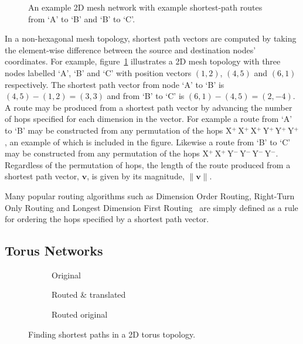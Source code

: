 		\begin{figure}
			\center
			\caption[Shortest path routes in a 2D mesh network.]%
			{An example 2D mesh network with example shortest-path routes
			from `A' to `B' and `B' to `C'.}
			\label{fig:mesh-topology-coordinates}
		\end{figure}
		
		In a non-hexagonal mesh topology, shortest path vectors are computed by
		taking the element-wise difference between the source and destination
		nodes' coordinates. For example, figure~\ref{fig:mesh-topology-coordinates}
		illustrates a 2D mesh topology with three nodes labelled `A', `B' and `C'
		with position vectors $(1, 2)$, $(4, 5)$ and $(6, 1)$ respectively. The
		shortest path vector from node `A' to `B' is $(4, 5) - (1, 2) = (3, 3)$ and
		from `B' to `C' is $(6, 1) - (4, 5) = (2, -4)$. A route may be produced
		from a shortest path vector by advancing the number of hops specified for
		each dimension in the vector.  For example a route from `A' to `B' may be
		constructed from any permutation of the hops
		X$^+\,$X$^+\,$X$^+\,$Y$^+\,$Y$^+\,$Y$^+$, an example of which is included
		in the figure. Likewise a route from `B' to `C' may be constructed from any
		permutation of the hops X$^+\,$X$^+\,$Y$^-\,$Y$^-\,$Y$^-\,$Y$^-$.
		Regardless of the permutation of hops, the length of the route produced
		from a shortest path vector, $\mathbf{v}$, is given by its magnitude,
		$\|\mathbf{v}\|$.
		
		Many popular routing algorithms such as Dimension Order Routing, Right-Turn
		Only Routing and Longest Dimension First Routing~\cite{davies12} are simply
		defined as a rule for ordering the hops specified by a shortest path
		vector.
		
		\subsection{Torus Networks}
			
			\begin{figure}
				\center
				\begin{subfigure}{0.3\linewidth}
					\center
					\caption{Original}
					\label{fig:torus-shortest-path-example}
				\end{subfigure}
				\begin{subfigure}{0.3\linewidth}
					\center
					\caption{Routed \& translated}
					\label{fig:torus-shortest-path-translate}
				\end{subfigure}
				\begin{subfigure}{0.3\linewidth}
					\center
					\caption{Routed original}
					\label{fig:torus-shortest-path-routed}
				\end{subfigure}
				
				\caption{Finding shortest paths in a 2D torus topology.}
				\label{fig:torus-shortest-path}
			\end{figure}
			
